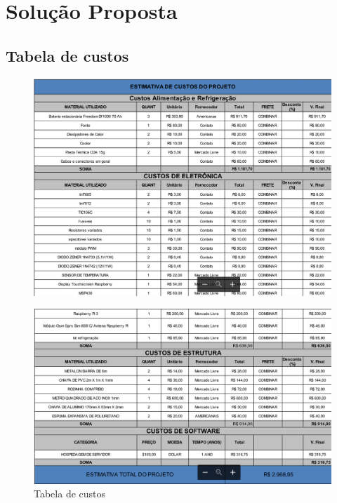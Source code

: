 \chapter[Solução Proposta]{Solução Proposta}







\section{Tabela de custos}

 \begin{figure}[H]
 	\begin{center}
 		\includegraphics[width=15cm]{figuras/custos.png}
 	\end{center}
 \end{figure}
 
 \begin{figure}[H]
 	\begin{center}
 		\includegraphics[width = 15cm]{figuras/custos_2.png}
 		\caption{Tabela de custos}
 	\end{center}
 \end{figure}
